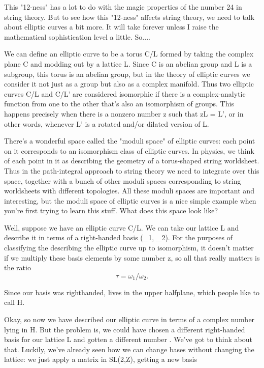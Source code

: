 This "12-ness" has a lot to do with the magic properties of the number
24 in string theory.  But to see how this "12-ness" affects string
theory, we need to talk about elliptic curves a bit more.   It will take
forever unless I raise the mathematical sophistication level a little. 
So....

We can define an elliptic curve to be a torus C/L formed by taking the 
complex plane C and modding out by a lattice L.   Since C is an abelian
group and L is a subgroup, this torus is an abelian group, but in the
theory of elliptic curves we consider it not just as a group but also as
a complex manifold.  Thus two elliptic curves C/L and C/L' are
considered isomorphic if there is a complex-analytic function from one
to the other that's also an isomorphism of groups.  This happens
precisely when there is a nonzero number z such that zL = L', or in
other words, whenever L' is a rotated and/or dilated version of L.   

There's a wonderful space called the "moduli space" of elliptic
curves: each point on it corresponds to an isomorphism class of
elliptic curves.  In physics, we think of each point in it as
describing the geometry of a torus-shaped string worldsheet.  Thus in
the path-integral approach to string theory we need to integrate over
this space, together with a bunch of other moduli spaces corresponding
to string worldsheets with different topologies.  All these moduli
spaces are important and interesting, but the moduli space of elliptic
curves is a nice simple example when you're first trying to learn this
stuff.  What does this space look like?

Well, suppose we have an elliptic curve C/L.  We can take our lattice
L and describe it in terms of a right-handed basis (\omega _{1}, \omega _{2}).
For the purposes of classifying the describing the elliptic curve up
to isomorphism, it doesn't matter if we multiply these basis elements
by some number z, so all that really matters is the ratio
$$
                       \tau  = \omega _{1}/\omega _{2}.
$$
    
Since our basis was righthanded, \tau  lives in the upper halfplane, 
which people like to call H.  

Okay, so now we have described our elliptic curve in terms of a
complex number \tau  lying in H.  But the problem is, we could have
chosen a different right-handed basis for our lattice L and gotten a
different number \tau .  We've got to think about that.  Luckily, we've
already seen how we can change bases without changing the lattice: we
just apply a matrix in SL(2,Z), getting a new basis

